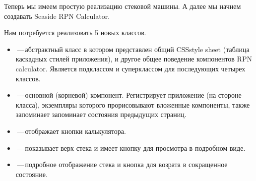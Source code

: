 \documentclass[a4paper,10pt,twoside]{book}
\begin{document}

Теперь мы имеем простую реализацию стековой машины.
А далее мы начнем создавать Seaside RPN Calculator.


Нам потребуется реализовать 5 новых классов.
\begin{itemize}
\item {}\,---\,абстрактный класс в котором представлен общий
CSSstyle sheet (таблица каскадных стилей приложения), и другое общее поведение компонентов RPN calculator. Является подклассом 
и суперклассом для последующих четырех классов.
  

\item {}\,---\,основной (корневой) компонент. Регистрирует
приложение (на стороне класса), экземпляры которого прорисовывают
вложенные компоненты, также запоминает запоминает состояния
предыдущих страниц.


\item {}\,---\,отображает кнопки калькулятора.


\item {}\,---\,показывает верх стека и имеет кнопку для
просмотра в подробном виде.


\item {}\,---\,подробное отображение стека и кнопка для
возрата в сокращенное состояние.
\end{itemize}
\end{document}
